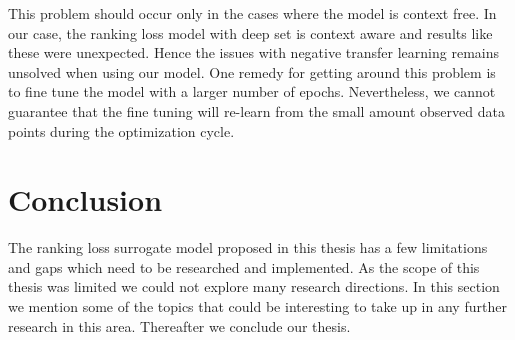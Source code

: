 \documentclass[12pt, twoside, ngerman]{report}
\begin{document}
This problem should occur only in the cases where the model is context free.
In our case,  the ranking loss model with deep set is context aware and results like these were unexpected.
Hence the issues with negative transfer learning remains unsolved when using our model.
One remedy for getting around this problem is to fine tune the model with a larger number of epochs.
Nevertheless,  we cannot guarantee that the fine tuning will re-learn from the small amount observed data points during the optimization cycle.

\chapter{Conclusion}

The ranking loss surrogate model proposed in this thesis has a few limitations and gaps which need to be researched and implemented. 
As the scope of this thesis was limited we could not explore many research directions.
In this section we mention some of the topics that could be interesting to take up in any further research in this area.
Thereafter we conclude our thesis.
\end{document}

